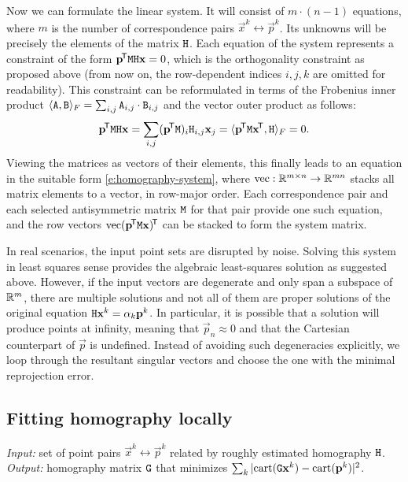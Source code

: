 Now we can formulate the linear system.
It will consist of $m \cdot (n - 1)$ equations, where $m$ is the number of correspondence pairs $\vec x^k \leftrightarrow \vec p^k$.
Its unknowns will be precisely the elements of the matrix $\mathtt{H}$.
Each equation of the system represents a constraint of the form $\mathbf{p}^{\!\mathsf{T}} \mathtt{M} \mathtt{H} \mathbf{x} = 0$, which is the orthogonality constraint as proposed above (from now on, the row-dependent indices $i, j, k$ are omitted for readability).
This constraint can be reformulated in terms of the Frobenius inner product $\langle \mathtt{A}, \mathtt{B} \rangle_F = \sum_{i, j} \mathtt{A}_{i, j} \cdot \mathtt{B}_{i, j}$ and the vector outer product as follows:
$$\mathbf{p}^{\!\mathsf{T}} \mathtt{M} \mathtt{H} \mathbf{x} = \sum_{i, j} (\mathbf{p}^{\!\mathsf{T}} \mathtt{M})_i \mathtt{H}_{i, j} \mathbf{x}_j = \langle \mathbf{p}^{\!\mathsf{T}} \mathtt{M} \mathbf{x}^{\!\mathsf{T}}, \mathtt{H} \rangle_F = 0.$$
Viewing the matrices as vectors of their elements, this finally leads to an equation in the suitable form \eqref{e:homography-system},
where $\mathrm{vec} : \mathbb{R}^{m \times n} \to \mathbb{R}^{mn}$ stacks all matrix elements to a vector, in row-major order.
Each correspondence pair and each selected antisymmetric matrix $\mathtt{M}$ for that pair provide one such equation, and the row vectors $\mathrm{vec} ({\mathbf{p}}^{\!\mathsf{T}} \mathtt{M} \mathbf{x})^{\!\mathsf{T}}$ can be stacked to form the system matrix.

In real scenarios, the input point sets are disrupted by noise.
Solving this system in least squares sense provides the algebraic least-squares solution as suggested above.
However, if the input vectors are degenerate and only span a subspace of $\mathbb{R}^m$, there are multiple solutions and not all of them are proper solutions of the original equation $\mathtt{H} \mathbf{x}^k = \alpha_k \mathbf{p}^k$.
In particular, it is possible that a solution will produce points at infinity, meaning that $\vec p_n \approx 0$ and that the Cartesian counterpart of $\vec p$ is undefined.
Instead of avoiding such degeneracies explicitly, we loop through the resultant singular vectors and choose the one with the minimal reprojection error.


\subsection{Fitting homography locally} 

\textit{Input:} set of point pairs $\vec x^k \leftrightarrow \vec p^k$ related by roughly estimated homography $\mathtt{H}$.\\
\textit{Output:} homography matrix $\mathtt{G}$ that minimizes $\sum_k |\mathrm{cart}(\mathtt{G} \mathbf{x}^k) - \mathrm{cart}(\mathbf{p}^k)|^2$.\\

